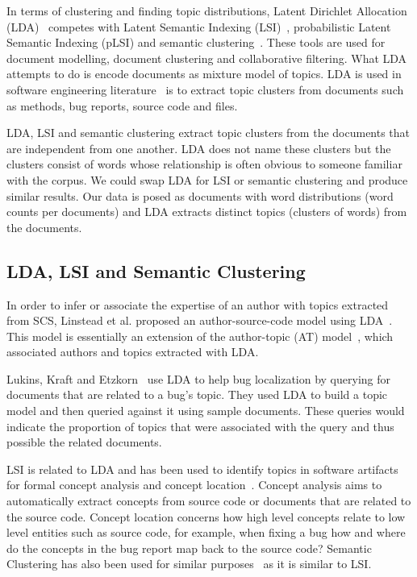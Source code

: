 \documentclass[times, 10pt,twocolumn]{article}
\begin{document}

In terms of clustering and finding topic distributions, Latent
Dirichlet Allocation (LDA)~\cite{944937} competes with Latent Semantic
Indexing (LSI)~\cite{1421013,1374321,10.1109/ICPC.2007.13,10.1109/ICPC.2006.17}, probabilistic Latent Semantic Indexing (pLSI) and
semantic clustering~\cite{1698774,1566153}. These tools are used for document modelling,
document clustering and collaborative filtering. What LDA attempts to
do is encode documents as mixture model of topics.  LDA is used in
software engineering
literature~\cite{lukins2008,10.1109/MSR.2007.20,NIPS2007637,1321709}
is to extract topic clusters from documents such as methods, bug
reports, source code and files.

LDA, LSI and semantic clustering extract topic
clusters from the documents that are independent from one another. LDA
does not name these clusters but the clusters consist of words whose
relationship is often obvious to someone familiar with the corpus. We
could swap LDA for LSI or semantic clustering and produce similar
results. Our data is posed as documents with word distributions (word
counts per documents) and LDA extracts distinct topics (clusters of
words) from the documents.

\subsection{LDA, LSI and Semantic Clustering}

In order to infer or associate the expertise of an author with topics
extracted from SCS, Linstead et al. proposed an author-source-code model
using LDA~\cite{10.1109/MSR.2007.20,NIPS2007637,1321709}. This model
is essentially an extension of the author-topic (AT)
model~\cite{1036902}, which associated authors and topics extracted
with LDA.

Lukins, Kraft and Etzkorn~\cite{lukins2008} use LDA to help bug
localization by querying for documents that are related to a bug's topic. They
used LDA to build a topic model and then queried against it using
sample documents. These queries would indicate the proportion of
topics that were associated with the query and thus possible the
related documents.

LSI is related to LDA and has been used to identify topics in software
artifacts for formal concept analysis and concept
location~\cite{1421013,1374321,10.1109/ICPC.2007.13,10.1109/ICPC.2006.17}.
Concept analysis aims to automatically extract concepts from source
code or documents that are related to the source code.  Concept location concerns how
high level concepts relate to low level entities such as source code, for
example, when fixing a bug how and where do the concepts in the bug
report map back to the source code?  Semantic Clustering has also been
used for similar purposes~\cite{1698774,1566153} as it is similar to
LSI.
\end{document}
